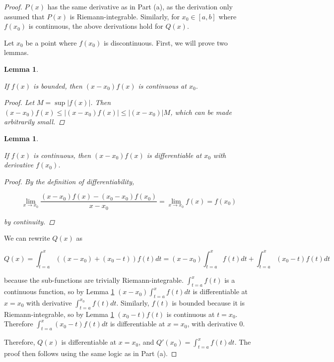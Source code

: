 \documentclass{amsart}
\newtheorem{lemma}[theorem]{Lemma}
\begin{document}
\begin{proof}

$P(x)$ has the same derivative as in Part (a), as the derivation only assumed that $P(x)$ is Riemann-integrable. Similarly, for $x_0 \in [a, b]$ where $f(x_0)$ is continuous, the above derivations hold for $Q(x)$.

Let $x_0$ be a point where $f(x_0)$ is discontinuous. First, we will prove two lemmas.

\begin{lemma}
\label{boundedIsCont}

If $f(x)$ is bounded, then $(x - x_0) f(x)$ is continuous at $x_0$.

\begin{proof}

Let $M = \sup |f(x)|$. Then $(x - x_0) f(x) \leq |(x - x_0) f(x)| \leq |(x - x_0)| M$, which can be made arbitrarily small.

\end{proof}
\end{lemma}

\begin{lemma}
\label{contIsDiff}

If $f(x)$ is continuous, then $(x - x_0) f(x)$ is differentiable at $x_0$ with derivative $f(x_0)$.

\begin{proof}

By the definition of differentiability,

\[
\lim_{x \to x_0} \frac{(x - x_0) f(x) - (x_0 - x_0) f(x_0)}{x - x_0}
= \lim_{x \to x_0} f(x) = f(x_0)
\]

by continuity.

\end{proof}
\end{lemma}

We can rewrite $Q(x)$ as

\[
Q(x) = \int_{t=a}^x ((x-x_0) + (x_0-t)) f(t) dt
= (x-x_0) \int_{t=a}^x f(t) dt + \int_{t=a}^x (x_0-t)f(t) dt
\]

because the sub-functions are trivially Riemann-integrable. $\int_{t=a}^x f(t)$ is a continuous function, so by Lemma \ref{contIsDiff} $(x-x_0) \int_{t=a}^x f(t) dt$ is differentiable at $x = x_0$ with derivative $\int_{t=a}^{x_0} f(t) dt$. Similarly, $f(t)$ is bounded because it is Riemann-integrable, so by Lemma \ref{boundedIsCont} $(x_0-t)f(t)$ is continuous at $t = x_0$. Therefore $\int_{t=a}^x (x_0-t)f(t) dt$ is differentiable at $x = x_0$, with derivative $0$.

Therefore, $Q(x)$ is differentiable at $x = x_0$, and $Q'(x_0) = \int_{t=a}^x f(t) dt$. The proof then follows using the same logic as in Part (a).

\end{proof}
\end{document}
